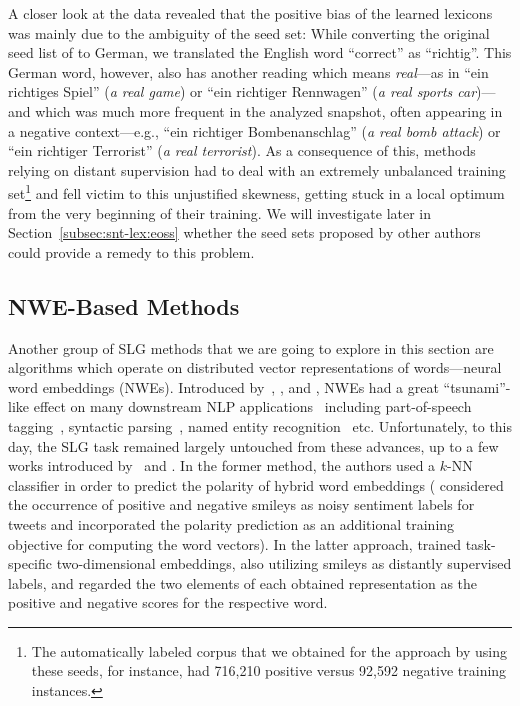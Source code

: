 A closer look at the data revealed that the positive bias of the
learned lexicons was mainly due to the ambiguity of the seed set:
While converting the original seed list of \citet{Turney:03} to
German, we translated the English word ``correct'' as ``richtig''.
This German word, however, also has another reading which means
\emph{real}---as in ``ein richtiges Spiel'' (\emph{a real game}) or
``ein richtiger Rennwagen'' (\emph{a real sports car})---and which was
much more frequent in the analyzed snapshot, often appearing in a
negative context---e.g., ``ein richtiger Bombenanschlag'' (\emph{a
  real bomb attack}) or ``ein richtiger Terrorist'' (\emph{a real
  terrorist}).  As a consequence of this, methods relying on distant
supervision had to deal with an extremely unbalanced training
set\footnote{The automatically labeled corpus that we obtained for the
  approach by \citet{Kiritchenko:14} using these seeds, for instance,
  had 716,210 positive versus 92,592 negative training instances.} and
fell victim to this unjustified skewness, getting stuck in a local
optimum from the very beginning of their training.  We will
investigate later in Section~\ref{subsec:snt-lex:eoss} whether the
seed sets proposed by other authors could provide a remedy to this
problem.

\subsection{NWE-Based Methods}

Another group of SLG methods that we are going to explore in this
section are algorithms which operate on distributed vector
representations of words---neural word embeddings (NWEs).  Introduced
by~\citet{Bengio:03}, \citet{Collobert:11}, and \citet{Mikolov:13},
NWEs had a great ``tsunami''-like effect on many downstream NLP
applications~\cite{Manning:15} including part-of-speech
tagging~\cite{Collobert:11}, syntactic
parsing~\cite{Kiperwasser:16b,Kiperwasser:16a}, named entity
recognition~\cite{dosSantos:15} etc.  Unfortunately, to this day, the
SLG task remained largely untouched from these advances, up to a few
works introduced by~\citet{Tang:14a} and \citet{Vo:16}.  In the former
method, the authors used a $k$-NN classifier in order to predict the
polarity of hybrid word embeddings (\citeauthor{Tang:14a} considered
the occurrence of positive and negative smileys as noisy sentiment
labels for tweets and incorporated the polarity prediction as an
additional training objective for computing the word vectors).  In the
latter approach, \citet{Vo:16} trained task-specific two-dimensional
embeddings, also utilizing smileys as distantly supervised labels, and
regarded the two elements of each obtained representation as the
positive and negative scores for the respective word.

